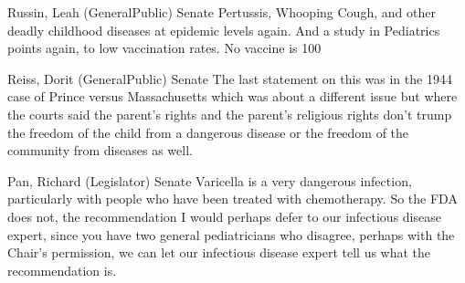 \begin{result}{7.460884752487668}{Russin, Leah (GeneralPublic) Senate}
Pertussis, Whooping Cough, and other deadly childhood diseases at epidemic levels again. And a study in Pediatrics points again, to low vaccination rates. No vaccine is 100%
\end{result}

\begin{result}{7.2673007812919455}{Reiss, Dorit (GeneralPublic) Senate}
The last statement on this was in the 1944 case of Prince versus Massachusetts which was about a different issue but where the courts said the parent's rights and the parent's religious rights don't trump the freedom of the child from a dangerous disease or the freedom of the community from diseases as well.
\end{result}

\begin{result}{6.680218306456022}{Pan, Richard (Legislator) Senate}
Varicella is a very dangerous infection, particularly with people who have been treated with chemotherapy. So the FDA does not, the recommendation I would perhaps defer to our infectious disease expert, since you have two general pediatricians who disagree, perhaps with the Chair's permission, we can let our infectious disease expert tell us what the recommendation is.
\end{result}

